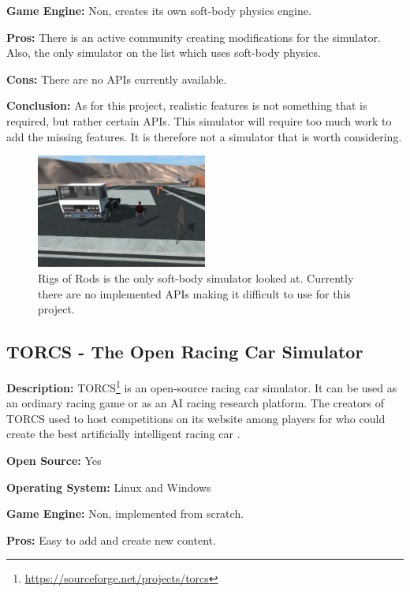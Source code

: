\textbf{Game Engine:} Non, creates its own soft-body physics engine.

\textbf{Pros:} There is an active community creating modifications for the simulator. Also, the only simulator on the list which uses soft-body physics. 

\textbf{Cons:} There are no APIs currently available. 

\textbf{Conclusion:} As for this project, realistic features is not something that is required, but rather certain APIs. This simulator will require too much work to add the missing features. It is therefore not a simulator that is worth considering. 

\begin{figure}[H]
    \centering
    \includegraphics[width=0.5\textwidth]{03_Background/Appendix/Simulators/RoR.png}
    \caption[Rigs of Rods]{Rigs of Rods is the only soft-body simulator looked at. Currently there are no implemented APIs making it difficult to use for this project.}
\end{figure}


\subsection{TORCS - The Open Racing Car Simulator}
\textbf{Description:} TORCS\footnote{\url{https://sourceforge.net/projects/torcs}} is an open-source racing car simulator. It can be used as an ordinary racing game or as an AI racing research platform. The creators of TORCS used to host competitions on its website among players for who could create the best artificially intelligent racing car \cite{TORCS_Racing}. 

\textbf{Open Source:} Yes

\textbf{Operating System:} Linux and Windows

\textbf{Game Engine:} Non, implemented from scratch.

\textbf{Pros:} Easy to add and create new content. 

